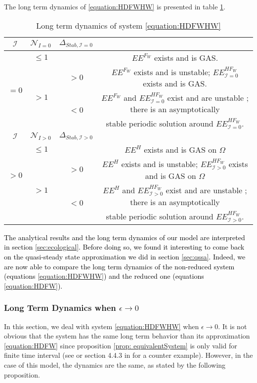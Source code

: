 \documentclass{article}
\newcommand{\cI}{\mathcal{I}}
\newcommand{\vtrois}[1]{\textcolor{black}{#1}}
\theoremstyle{definition}
\theoremstyle{remark}
\begin{document}
The long term dynamics of \eqref{equation:HDFWHW} is presented in table \ref{table:long term dynamics, I = 0}.
\vtrois{
\begin{table}[!ht]
\centering
\def\arraystretch{2}
\begin{tabular}{c|c|c|c}
$\cI$  & $\mathcal{N}_{I = 0}$ &  $\Delta_{Stab, \cI = 0}$ & \\
\hline
\multirow{4}{*}{$=0$}& $ \leq 1$ & &$EE^{F_W}$ exists and is GAS.  \\
\cline{2-4}
 &  \multirow{3}{*}{$> 1$} & $ >0$ &$EE^{F_W}$ exists and is unstable; $EE^{HF_W}_{\cI=0}$ exists and is GAS.\\
 \cline{3-4}
 &  &\multirow{2}{*}{$ <0 $} & $EE^{F_W}$ and $EE^{HF_W}_{\cI=0}$ exist and are unstable ; there is an asymptotically \\
&  & &  stable periodic solution around $EE^{HF_W}_{\cI=0}$. \\
\hline
\hline
$\cI$  & $\mathcal{N}_{I > 0}$ &  $\Delta_{Stab, \cI > 0}$ & \\
\hline
\multirow{3}{*}{$>0$} & $\leq1$ & &$EE^{H}$ exists and is GAS on $\Omega$ \\
\cline{2-4}
 & \multirow{3}{*}{$> 1$}  & $>0$ &$EE^{H}$ exists and is unstable; $EE^{HF_W}_{\cI>0}$ exists and is GAS on $\Omega$ \\
 \cline{3-4}
 & & \multirow{2}{*}{$ < 0$} &$EE^{H}$ and $EE^{HF_W}_{\cI>0}$ exist and are unstable ; there is an asymptotically \\
 & & &  stable periodic solution around $EE^{HF_W}_{\cI>0}$.
\end{tabular}
\caption{\centering Long term dynamics of system \eqref{equation:HDFWHW}}
\label{table:long term dynamics, I = 0}
\end{table}
}

\vtrois{
The analytical results and the long term dynamics of our model are interpreted in section \ref{sec:ecological}. Before doing so, we found it interesting to come back on the quasi-steady state approximation we did in section \ref{sec:qssa}. Indeed, we are now able to compare the long term dynamics of the non-reduced system (equations \eqref{equation:HDFWHW}) and the reduced one (equations \eqref{equation:HDFW}).
}


\subsubsection{Long Term Dynamics when $\epsilon \rightarrow 0$}
In this section, we deal with system \eqref{equation:HDFWHW} when $\epsilon \rightarrow 0$. It is not obvious that the system has the same long term behavior than its approximation \eqref{equation:HDFW} since proposition \ref{prop: equivalentSystem} is only valid for finite time interval (see \cite{auger_aggregation_2008} or section 4.4.3 in \cite{banasiak_methods_2014} for a counter example). However, in the case of this model, the dynamics are the same, as stated by the following proposition.
\end{document}
